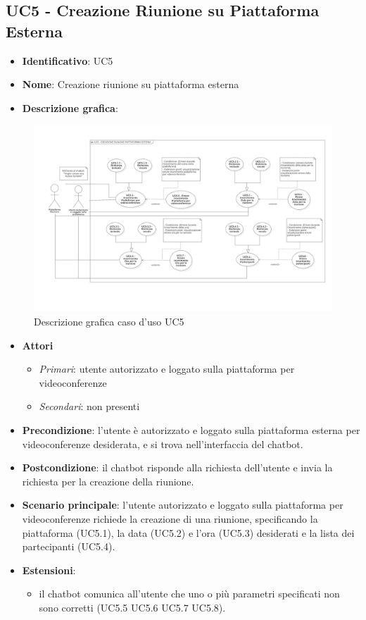 \subsection{UC5 - Creazione Riunione su Piattaforma Esterna}
\begin{itemize}
    \item \textbf{Identificativo}: UC5
    \item \textbf{Nome}: Creazione riunione su piattaforma esterna
    \item \textbf{Descrizione grafica}:
\end{itemize}

\begin{figure}[h]
   \centering
   \includegraphics[scale=0.9]{images/UC5.png} 
   \caption{Descrizione grafica caso d'uso UC5}
\end{figure}

 \begin{itemize}
    \item \textbf{Attori}
 \begin{itemize} 
    \item \textit{Primari}: utente autorizzato e loggato sulla piattaforma per videoconferenze
    \item \textit{Secondari}: non presenti
 \end{itemize}
 \item \textbf{Precondizione}: l'utente è autorizzato e loggato sulla piattaforma esterna per videoconferenze desiderata, e si trova nell'interfaccia del chatbot.
 \item \textbf{Postcondizione}: il chatbot risponde alla richiesta dell'utente e invia la richiesta per la creazione della riunione.
 \item \textbf{Scenario principale}: l'utente autorizzato e loggato sulla piattaforma per videoconferenze richiede la creazione di una riunione, specificando la piattaforma (UC5.1), la data (UC5.2) e l'ora (UC5.3) desiderati e la lista dei partecipanti (UC5.4).
 \item \textbf{Estensioni}: 
 \begin{itemize} 
    \item il chatbot comunica all'utente che uno o più parametri specificati non sono corretti (UC5.5 UC5.6 UC5.7 UC5.8).
 \end{itemize}
\end{itemize}
\newpage


